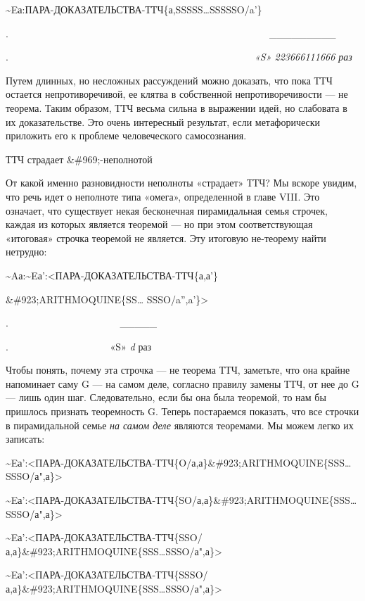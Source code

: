 \documentclass[../main.tex]{subfiles}
\begin{document}
\textasciitilde Eа:ПАРА-ДОКАЗАТЕЛЬСТВА-ТТЧ\{а,SSSSS\ldots SSSSSO/a'\}

.~~~~~~~~~~~~~~~~~~~~~~~~~~~~~~~~~~~~~~~~~~~~~~~~~~~~~\textbar\_\_\_\_\_\_\_\_\_\textbar{}

.~~~~~~~~~~~~~~~~~~~~~~~~~~~~~~~~~~~~~~~~~~~~~~~~~~\emph{«S» 223666111666 раз}

Путем длинных, но несложных рассуждений можно доказать, что пока ТТЧ остается непротиворечивой, ее клятва в собственной непротиворечивости --- не теорема. Таким образом, ТТЧ весьма сильна в выражении идей, но слабовата в их доказательстве. Это очень интересный результат, если метафорически приложить его к проблеме человеческого самосознания.

ТТЧ страдает \&\#969;-неполнотой

От какой именно разновидности неполноты «страдает» ТТЧ? Мы вскоре увидим, что речь идет о неполноте типа «омега», определенной в главе VIII. Это означает, что существует некая бесконечная пирамидальная семья строчек, каждая из которых является теоремой --- но при этом соответствующая «итоговая» строчка теоремой не является. Эту итоговую не-теорему найти нетрудно:

\textasciitilde Aа:\textasciitilde Eа':\textless ПАРА-ДОКАЗАТЕЛЬСТВА-ТТЧ\{а,а'\}

\&\#923;ARITHMOQUINE\{SS\ldots{} SSSO/a'',a'\}\textgreater{}

.~~~~~~~~~~~~~~~~~~~~~~ \textbar\_\_\_\_\_\textbar{}

.~~~~~~~~~~~~~~~~~~~~ «S» \emph{d} раз

Чтобы понять, почему эта строчка --- не теорема ТТЧ, заметьте, что она крайне напоминает саму G --- на самом деле, согласно правилу замены ТТЧ, от нее до G --- лишь один шаг. Следовательно, если бы она была теоремой, то нам бы пришлось признать теоремность G. Теперь постараемся показать, что все строчки в пирамидальной семье \emph{на самом деле} являются теоремами. Мы можем легко их записать:

\textasciitilde Eа':\textless ПАРА-ДОКАЗАТЕЛЬСТВА-ТТЧ\{O/а,а\}\&\#923;ARITHMOQUINE\{SSS\ldots SSSO/а",а\}\textgreater{}

\textasciitilde Eа':\textless ПАРА-ДОКАЗАТЕЛЬСТВА-ТТЧ\{SO/а,а\}\&\#923;ARITHMOQUINE\{SSS\ldots SSSO/а",а\}\textgreater{}

\textasciitilde Eа':\textless ПАРА-ДОКАЗАТЕЛЬСТВА-ТТЧ\{SSO/а,а\}\&\#923;ARITHMOQUINE\{SSS\ldots SSSO/а",а\}\textgreater{}

\textasciitilde Eа':\textless ПАРА-ДОКАЗАТЕЛЬСТВА-ТТЧ\{SSSO/а,а\}\&\#923;ARITHMOQUINE\{SSS\ldots SSSO/а",а\}\textgreater{}
\end{document}
